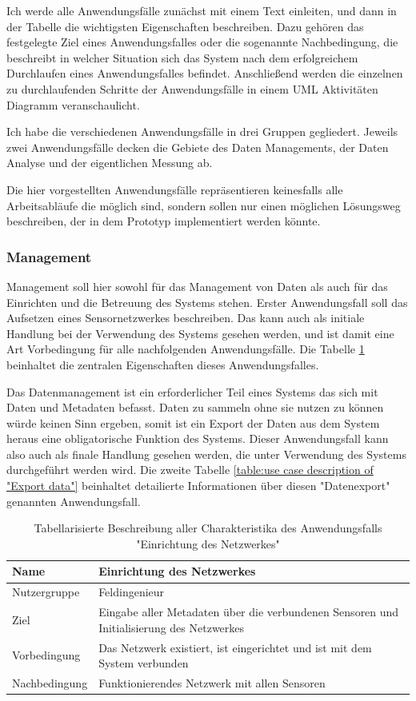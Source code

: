 Ich werde alle Anwendungsfälle zunächst mit einem Text einleiten, und dann in der Tabelle die wichtigsten Eigenschaften beschreiben. Dazu gehören das festgelegte Ziel eines Anwendungsfalles oder die sogenannte Nachbedingung, die beschreibt in welcher Situation sich das System nach dem erfolgreichem Durchlaufen eines Anwendungsfalles befindet. Anschließend werden die einzelnen zu durchlaufenden Schritte der Anwendungsfälle in einem \gls{UML} Aktivitäten Diagramm veranschaulicht.

Ich habe die verschiedenen Anwendungsfälle in drei Gruppen gegliedert. Jeweils zwei Anwendungsfälle decken die Gebiete des Daten Managements, der Daten Analyse und der eigentlichen Messung ab.

Die hier vorgestellten Anwendungsfälle repräsentieren keinesfalls alle Arbeitsabläufe die möglich sind, sondern sollen nur einen möglichen Lösungsweg beschreiben, der in dem Prototyp implementiert werden könnte.

\subsubsection{Management}
Management soll hier sowohl für das Management von Daten als auch für das Einrichten und die Betreuung des Systems stehen. Erster Anwendungsfall soll das Aufsetzen eines Sensornetzwerkes beschreiben. Das kann auch als initiale Handlung bei der Verwendung des Systems gesehen werden, und ist damit eine Art Vorbedingung für alle nachfolgenden Anwendungsfälle. Die Tabelle \ref{table:use case description of "Set up network"} beinhaltet die zentralen Eigenschaften dieses Anwendungsfalles.

Das Datenmanagement ist ein erforderlicher Teil eines Systems das sich mit Daten und Metadaten befasst. Daten zu sammeln ohne sie nutzen zu können würde keinen Sinn ergeben, somit ist ein Export der Daten aus dem System heraus eine obligatorische Funktion des Systems. Dieser Anwendungsfall kann also auch als finale Handlung gesehen werden, die unter Verwendung des Systems durchgeführt werden wird. Die zweite Tabelle \ref{table:use case description of "Export data"} beinhaltet detailierte Informationen über diesen "Datenexport" genannten Anwendungsfall.

\begin{table}[H]
\centering
\begin{tabular}{l | p{11cm}}
Name & Einrichtung des Netzwerkes\\ \hline 
Nutzergruppe & Feldingenieur\\ \hline 
Ziel & Eingabe aller Metadaten über die verbundenen Sensoren und Initialisierung des Netzwerkes\\ \hline 
Vorbedingung & Das Netzwerk existiert, ist eingerichtet und ist mit dem System verbunden\\ \hline 
Nachbedingung & Funktionierendes Netzwerk mit allen Sensoren\\ 
\end{tabular}
\caption{Tabellarisierte Beschreibung aller Charakteristika des Anwendungsfalls "Einrichtung des Netzwerkes"} 
\label{table:use case description of "Set up network"}
\end{table}


